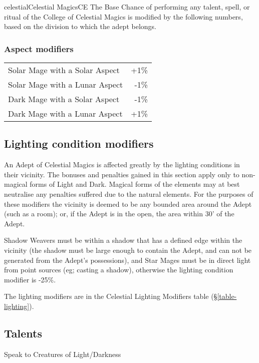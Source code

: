 \begin{college}[1.3]{celestial}{Celestial Magics}{CE}
The Base Chance of performing any talent, spell, or ritual of the
College of Celestial Magics is modified by the following numbers,
based on the division to which the adept belongs.

\subsubsection{Aspect modifiers}

\begin{tabularx}{\linewidth}{Xr}
Solar Mage with a Solar Aspect & +1\% \\
Solar Mage with a Lunar Aspect  & -1\% \\
Dark Mage with a Solar Aspect  & -1\% \\
Dark Mage with a Lunar Aspect  & +1\% \\
\end{tabularx}

\subsection{Lighting condition modifiers}

An Adept of Celestial Magics is affected greatly by the lighting
conditions in their vicinity. The bonuses and penalties gained in this
section apply only to non-magical forms of Light and Dark. Magical
forms of the elements may at best neutralise any penalties suffered
due to the natural elements. For the purposes of these modifiers the
vicinity is deemed to be any bounded area around the Adept (such as a
room); or, if the Adept is in the open, the area within 30' of the
Adept.

Shadow Weavers must be within a shadow that has a defined edge within
the vicinity (the shadow must be large enough to contain the Adept,
and can not be generated from the Adept's possessions), and Star Mages
must be in direct light from point sources (eg; casting a shadow),
otherwise the lighting condition modifier is -25\%.

The lighting modifiers are in the Celestial Lighting Modifiers table
(\S\ref{table-lighting}).

\subsection{Talents}

\begin{talent}[T-1]{Speak to Creatures of Light/Darkness}


\end{talent}
\end{college}
